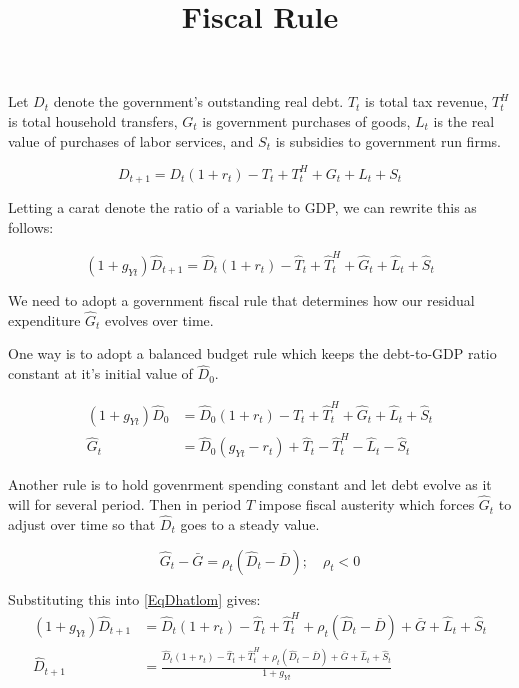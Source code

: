 \documentclass[letterpaper,11pt]{article}
\theoremstyle{definition}
\begin{document}
\title{Fiscal Rule}
\maketitle
Let $D_t$ denote the government's outstanding real debt.  $T_t$ is total tax revenue, $T^H_t$ is total household transfers, $G_t$ is government purchases of goods, $L_t$ is the real value of purchases of labor services, and $S_t$ is subsidies to government run firms.

\begin{equation}
	D_{t+1} = D_t(1+r_t) - T_t + T^H_t + G_t + L_t + S_t
\end{equation}

Letting a carat denote the ratio of a variable to GDP, we can rewrite this as follows:

\begin{equation} \label{EqDhatlom}
	(1+g_{Yt}) \hat D_{t+1} = \hat D_t(1+r_t) - \hat T_t + \hat T^H_t + \hat G_t + \hat L_t + \hat S_t
\end{equation}

We need to adopt a government fiscal rule that determines how our residual expenditure $\hat G_t$ evolves over time.

One way is to adopt a balanced budget rule which keeps the debt-to-GDP ratio constant at it's initial value of $\hat D_0$.

\begin{align}
	(1+g_{Yt}) \hat D_0 & = \hat D_0(1+r_t) - \hat T_t + \hat T^H_t + \hat G_t + \hat L_t + \hat S_t \nonumber \\
	\hat G_t & = \hat D_0(g_{Yt}-r_t) + \hat T_t - \hat T^H_t -\hat L_t - \hat S_t \label{EqBalBudRule}
\end{align}

Another rule is to hold govenrment spending constant and let debt evolve as it will for several period.  Then in period $T$ impose fiscal austerity which forces $\hat G_t$ to adjust over time so that $\hat D_t$ goes to a steady value.

\begin{equation}
	\hat G_t - \bar G = \rho_t (\hat D_t - \bar D);\quad \rho_t<0 \label{EqAdjRule}
\end{equation}

Substituting this into \eqref{EqDhatlom} gives:
\begin{align}
	(1+g_{Yt}) \hat D_{t+1} & = \hat D_t(1+r_t) - \hat T_t + \hat T^H_t + \rho_t (\hat D_t - \bar D) + \bar G + \hat L_t + \hat S_t \nonumber \\
	\hat D_{t+1} & = \frac{\hat D_t(1+r_t) - \hat T_t + \hat T^H_t + \rho_t (\hat D_t - \bar D) + \bar G + \hat L_t + \hat S_t }{1+g_{Yt}} \label{EqDhatlom2}
\end{align}
\end{document}
